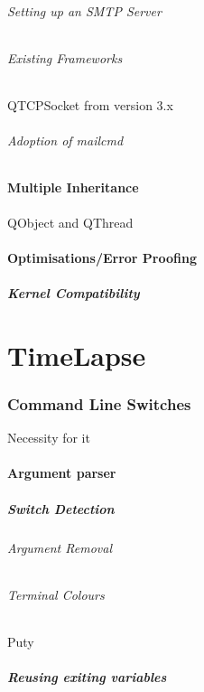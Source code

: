 \documentclass[11pt]{article} %
\begin{document}
\paragraph{Setting up an SMTP Server}
\paragraph{Existing Frameworks}{QTCPSocket from version 3.x}
\paragraph{Adoption of mailcmd}
\subsection{Multiple Inheritance}{QObject and QThread}
\subsection{Optimisations/Error Proofing}
\subsubsection{Kernel Compatibility}


\part{TimeLapse}
\section{Command Line Switches}{Necessity for it}
\subsection{Argument parser}
\subsubsection{Switch Detection}
\paragraph{Argument Removal}
\paragraph{Terminal Colours}{Puty}
\subsubsection{Reusing exiting variables}
\end{document}

